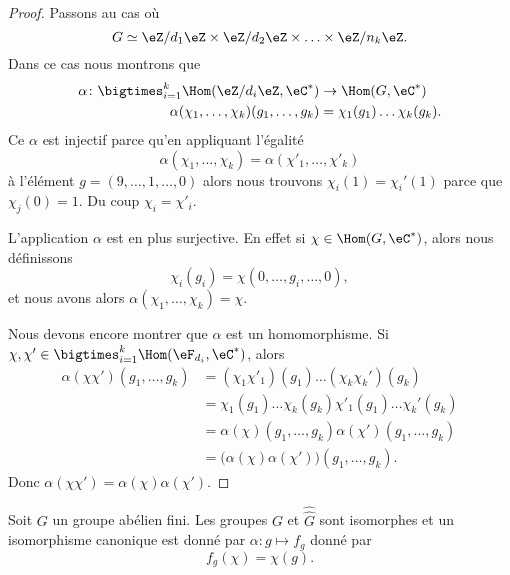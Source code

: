 \begin{proof}
    Passons au cas où
    \begin{equation}
        G\simeq \eZ/d_1\eZ\times \eZ/d_2\eZ\times \ldots\times \eZ/n_k\eZ.
    \end{equation}
    Dans ce cas nous montrons que 
    \begin{equation}
        \begin{aligned}
            \alpha\colon \bigtimes_{i=1}^k\Hom(\eZ/d_i\eZ,\eC^*)&\to \Hom(G,\eC^*) \\
            \alpha(\chi_1,\ldots, \chi_k)(g_1,\ldots, g_k)&= \chi_1(g_1)\ldots\chi_k(g_k). 
        \end{aligned}
    \end{equation}
    Ce \( \alpha\) est injectif parce qu'en appliquant l'égalité
    \begin{equation}
        \alpha(\chi_1,\ldots, \chi_k)=\alpha(\chi'_1,\ldots, \chi'_k)
    \end{equation}
    à l'élément \( g=(9,\ldots, 1,\ldots, 0)\) alors nous trouvons \( \chi_i(1)=\chi_i'(1)\) parce que \( \chi_j(0)=1\). Du coup \( \chi_i=\chi'_i\).

    L'application \( \alpha\) est en plus surjective. En effet si \( \chi\in\Hom(G,\eC^*)\), alors nous définissons
    \begin{equation}
        \chi_i(g_i)=\chi(0,\ldots, g_i,\ldots, 0),
    \end{equation}
    et nous avons alors \( \alpha(\chi_1,\ldots, \chi_k)=\chi\).

    Nous devons encore montrer que \( \alpha\) est un homomorphisme. Si \( \chi,\chi'\in\bigtimes_{i=1}^k\Hom(\eF_{d_i},\eC^*)\), alors
    \begin{subequations}
        \begin{align}
            \alpha(\chi\chi')(g_1,\ldots, g_k)&=(\chi_1\chi'_1)(g_1)\ldots (\chi_k\chi_k')(g_k)\\
            &=\chi_1(g_1)\ldots \chi_k(g_k)\chi'_1(g_1)\ldots \chi_k'(g_k)\\
            &=\alpha(\chi)(g_1,\ldots, g_k)\alpha(\chi')(g_1,\ldots, g_k)\\
            &=\big( \alpha(\chi)\alpha(\chi') \big)(g_1,\ldots, g_k).
        \end{align}
    \end{subequations}
    Donc \( \alpha(\chi\chi')=\alpha(\chi)\alpha(\chi')\).
\end{proof}

\begin{theorem}
    Soit \( G\) un groupe abélien fini. Les groupes \( G\) et \( \hat{\hat G}\) sont isomorphes et un isomorphisme canonique est donné par \( \alpha\colon g\mapsto f_g\) donné par
    \begin{equation}
        f_g(\chi)=\chi(g).
    \end{equation}
\end{theorem}

